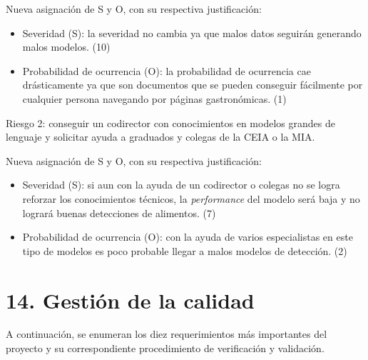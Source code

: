 \documentclass[
11pt, %
]{charter}
\begin{document}
Nueva asignación de S y O, con su respectiva justificación:
\begin{itemize}
\item Severidad (S): la severidad no cambia ya que malos datos seguirán generando malos modelos. (10)
\item Probabilidad de ocurrencia (O): la probabilidad de ocurrencia cae drásticamente ya que son documentos que se pueden conseguir fácilmente por cualquier persona navegando por páginas gastronómicas. (1)
\end{itemize}

Riesgo 2: conseguir un codirector con conocimientos en modelos grandes de lenguaje y solicitar ayuda a graduados y colegas de la CEIA o la MIA.

Nueva asignación de S y O, con su respectiva justificación:
\begin{itemize}
\item Severidad (S):  si aun con la ayuda de un codirector o colegas no se logra reforzar los conocimientos técnicos, la \textit{performance} del modelo será baja y no logrará buenas detecciones de alimentos. (7)
\item Probabilidad de ocurrencia (O): con la ayuda de varios especialistas en este tipo de modelos es poco probable llegar a malos modelos de detección. (2)
\end{itemize}


\section{14. Gestión de la calidad}
\label{sec:calidad}


A continuación, se enumeran los diez requerimientos más importantes del proyecto y su correspondiente procedimiento de verificación y validación. 
\end{document}
